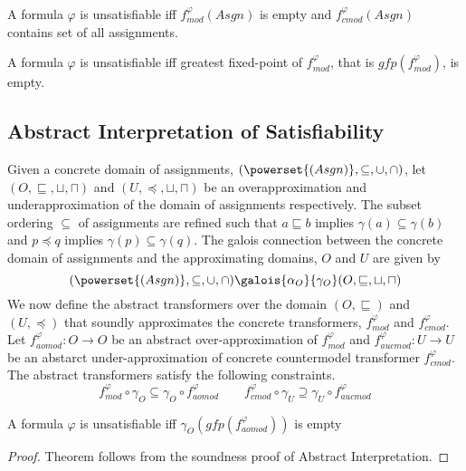 \begin{theorem}
  A formula $\varphi$ is unsatisfiable iff $f_{mod}^\varphi(Asgn)$ is empty 
  and $f_{cmod}^\varphi(Asgn)$ contains set of all assignments. 
\end{theorem}

\begin{theorem}
  A formula $\varphi$ is unsatisfiable iff greatest fixed-point of
  $f_{mod}^\varphi$, that is $gfp(f_{mod}^\varphi)$, is empty.
\end{theorem}

\subsection{Abstract Interpretation of Satisfiability}
%
Given a concrete domain of assignments, $(\powerset{(Asgn)},\subseteq,\cup,\cap)$, let 
$(O,\sqsubseteq,\sqcup,\sqcap)$ and $(U,\preceq,\sqcup,\sqcap)$ be an
overapproximation and underapproximation of the domain of assignments
respectively. The subset ordering $\subseteq$ of assignments are refined 
such that $a \sqsubseteq b$ implies $\gamma(a) \subseteq \gamma(b)$ and 
$p \preceq q$ implies $\gamma(p) \subseteq \gamma(q)$.  The galois connection
between the concrete domain of assignments and the approximating domains, $O$
and $U$ are given by 
\[  
    (\powerset{(Asgn)},\subseteq,\cup,\cap)
    \galois{\alpha_O}{\gamma_O}
    (O,\sqsubseteq,\sqcup,\sqcap)
\]
%
We now define the abstract transformers over the domain $(O, \sqsubseteq)$ and
$(U, \preceq)$ that soundly approximates the concrete transformers, 
$f_{mod}^\varphi$ and $f_{cmod}^\varphi$.  Let $f_{aomod}^\varphi : O \rightarrow O$ 
be an abstract over-approximation of $f_{mod}^\varphi$ and $f_{aucmod}^\varphi :
U\rightarrow U$ be an abstarct under-approximation of concrete countermodel transformer 
$f_{cmod}^\varphi$. The abstract transformers satisfy the following constraints. 
\[
f_{mod}^\varphi \circ \gamma_O  \subseteq \gamma_O \circ f_{aomod}^\varphi
\qquad 
f_{cmod}^\varphi \circ \gamma_U  \supseteq \gamma_U \circ f_{aucmod}^\varphi
\]
%
\begin{theorem}
  A formula $\varphi$ is unsatisfiable iff $\gamma_O(gfp(f_{aomod}^\varphi))$ is empty 
\end{theorem}
\begin{proof}
  Theorem  follows from the soundness proof of Abstract
  Interpretation. 
\end{proof}
%
